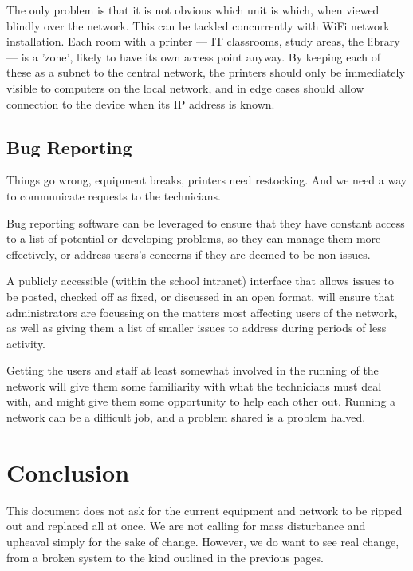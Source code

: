 \documentclass[a4paper,leqno,titlepage]{article}
\begin{document}
The only problem is that it is not obvious which unit is which, when viewed
blindly over the network. This can be tackled concurrently with WiFi network
installation. Each room with a printer  --- IT classrooms,
study areas, the library --- is a 'zone', likely to have its own access point
anyway. By keeping each of these as a subnet to the central network, the
printers should only be immediately visible to computers on the local network,
and in edge cases should allow connection to the device when its IP address
is known.


\subsection{Bug Reporting}

Things go wrong, equipment breaks, printers need restocking. And we need a way
to communicate requests to the technicians.


Bug reporting software can be leveraged to ensure that they have constant access
to a list of potential or developing problems, so they can manage them more
effectively, or address users's concerns if they are deemed to be non-issues.


A publicly accessible (within the school intranet) interface that allows issues
to be posted, checked off as fixed, or discussed in an open format, will
ensure that administrators are focussing on the matters most affecting users of
the network, as well as giving them a list of smaller issues to address during
periods of less activity.


Getting the users and staff at least somewhat involved in the running
of the network will give them some familiarity with what the technicians must
deal with, and might give them some opportunity to help each other out.
Running a network can be a difficult job, and a problem shared is a problem
halved.



\break








\section{Conclusion}

This document does not ask for the current equipment and network to be ripped
out and replaced all at once. We are not calling for mass disturbance and
upheaval simply for the sake of change.
However, we do want to see real change, from a
broken system to the kind outlined in the previous pages.
\end{document}
